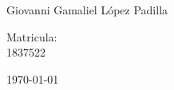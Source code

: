 \documentclass[12pt,letterpaper]{report}
\begin{document}
\begin{titlepage}
\begin{center}
\begin{minipage}{0.6\linewidth}
Giovanni Gamaliel López Padilla
\end{minipage}
\begin{minipage}{0.2\linewidth}
\changefontsizes{14pt} 
Matricula:\\                                                                                                                        
1837522
\end{minipage}
\end{center}
\vspace{4cm}
\begin{flushright}
\today
\end{flushright}
\end{titlepage}
\begin{enumerate}

\end{enumerate}
\end{document}
